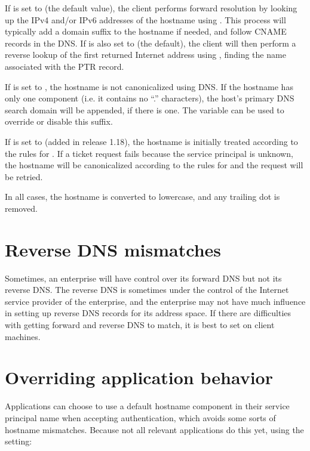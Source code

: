 \documentclass[letterpaper,10pt,english]{sphinxmanual}
\begin{document}
If  is set to  (the default
value), the client performs forward resolution by looking up the IPv4
and/or IPv6 addresses of the hostname using .  This
process will typically add a domain suffix to the hostname if needed,
and follow CNAME records in the DNS.  If  is also set to
 (the default), the client will then perform a reverse lookup
of the first returned Internet address using ,
finding the name associated with the PTR record.

If  is set to , the hostname is
not canonicalized using DNS.  If the hostname has only one component
(i.e. it contains no “.” characters), the host’s primary DNS search
domain will be appended, if there is one.  The 
variable can be used to override or disable this suffix.

If  is set to  (added in
release 1.18), the hostname is initially treated according to the
rules for .  If a ticket request
fails because the service principal is unknown, the hostname will be
canonicalized according to the rules for
 and the request will be retried.

In all cases, the hostname is converted to lowercase, and any trailing
dot is removed.


\section{Reverse DNS mismatches}
\label{\detokenize{admin/princ_dns:reverse-dns-mismatches}}
Sometimes, an enterprise will have control over its forward DNS but
not its reverse DNS.  The reverse DNS is sometimes under the control
of the Internet service provider of the enterprise, and the enterprise
may not have much influence in setting up reverse DNS records for its
address space.  If there are difficulties with getting forward and
reverse DNS to match, it is best to set  on client
machines.


\section{Overriding application behavior}
\label{\detokenize{admin/princ_dns:overriding-application-behavior}}
Applications can choose to use a default hostname component in their
service principal name when accepting authentication, which avoids
some sorts of hostname mismatches.  Because not all relevant
applications do this yet, using the {\hyperref[\detokenize{admin/conf_files/krb5_conf:krb5-conf-5}]{}} setting:
\end{document}
